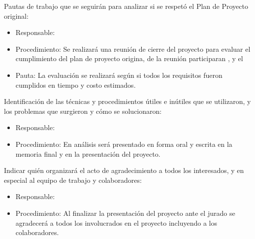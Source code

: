 \documentclass[11pt]{charter}
\begin{document}
Pautas de trabajo que se seguirán para analizar si se respetó el Plan de Proyecto original:
\begin{itemize}
\item Responsable: \authorname
\item Procedimiento: Se realizará una reunión de cierre del proyecto para evaluar el cumplimiento del plan de proyecto origina, de la reunión participaran \clientename, \supname y el \authorname
\item Pauta: La evaluación se realizará según si todos los requisitos fueron cumplidos en tiempo y costo estimados.
\end{itemize}
Identificación de las técnicas y procedimientos útiles e inútiles que se utilizaron, y los problemas que surgieron y cómo se solucionaron:
\begin{itemize}
\item Responsable: \authorname
\item Procedimiento: En análisis será presentado en forma oral y escrita en la memoria final y en la presentación del proyecto.
\end{itemize}
Indicar quién organizará el acto de agradecimiento a todos los interesados, y en especial al equipo de trabajo y colaboradores:
\begin{itemize}
\item Responsable: \authorname
\item Procedimiento: Al finalizar la presentación del proyecto ante el jurado se agradecerá a todos los involucrados en el proyecto incluyendo a los colaboradores.
\end{itemize}
\end{document}
